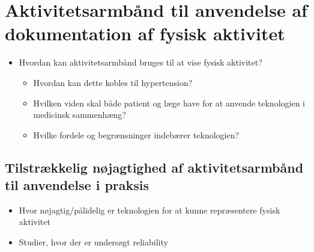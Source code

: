 \section{Aktivitetsarmbånd til anvendelse af dokumentation af fysisk aktivitet}
\begin{itemize}
\item Hvordan kan aktivitetsarmbånd bruges til at vise fysisk aktivitet?
\begin{itemize}
\item Hvordan kan dette kobles til hypertension?
\item Hvilken viden skal både patient og læge have for at anvende teknologien i medicinsk sammenhæng?
\item Hvilke fordele og begrænsninger indebærer teknologien?
\end{itemize}

\end{itemize}

\subsection{Tilstrækkelig nøjagtighed af aktivitetsarmbånd til anvendelse i praksis}
\begin{itemize}
\item Hvor nøjagtig/pålidelig er teknologien for at kunne repræsentere fysisk aktivitet
\item Studier, hvor der er undersøgt reliability
\end{itemize}